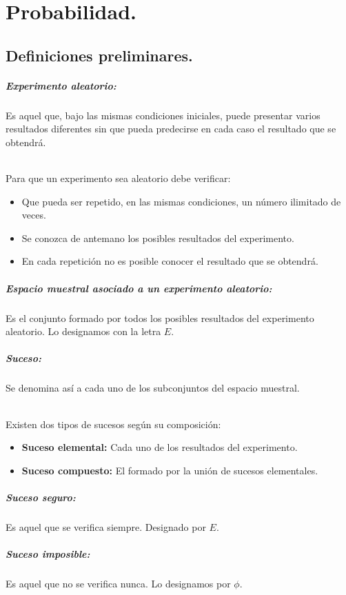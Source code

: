 \chapter{Probabilidad.}
\section{Definiciones preliminares.}
\paragraph{Experimento aleatorio:}
Es aquel que, bajo las mismas condiciones iniciales, puede presentar varios resultados diferentes sin que pueda predecirse en cada caso el resultado que se obtendrá.
\subparagraph{}
Para que un experimento sea aleatorio debe verificar:
\begin{itemize}
\item Que pueda ser repetido, en las mismas condiciones, un número ilimitado de veces.
\item Se conozca de antemano los posibles resultados del experimento.
\item En cada repetición no es posible conocer el resultado que se obtendrá.
\end{itemize}
\paragraph{Espacio muestral asociado a un experimento aleatorio:}
Es el conjunto formado por todos los posibles resultados del experimento aleatorio. Lo designamos con la letra $E$.
\paragraph{Suceso:} Se denomina así a cada uno de los subconjuntos del espacio muestral.
\subparagraph{}
Existen dos tipos de sucesos según su composición:
\begin{itemize}
\item \textbf{Suceso elemental:} Cada uno de los resultados del experimento.
\item \textbf{Suceso compuesto:} El formado por la unión de sucesos elementales.
\end{itemize}
\paragraph{Suceso seguro:}
Es aquel que se verifica siempre. Designado por $E$.
\paragraph{Suceso imposible:}
Es aquel que no se verifica nunca. Lo designamos por $\phi$.
